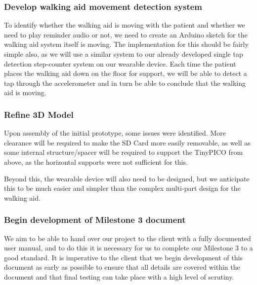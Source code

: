 {\subsubsection{Develop walking aid movement detection system}

To identify whether the walking aid is moving with the patient and whether we need to play reminder audio or not, we need to create an Arduino sketch for the walking aid system itself is moving. The implementation for this should be fairly simple also, as we will use a similar system to our already developed single tap detection step-counter system on our wearable device. Each time the patient places the walking aid down on the floor for support, we will be able to detect a tap through the accelerometer and in turn be able to conclude that the walking aid is moving.

\subsubsection{Refine 3D Model}

Upon assembly of the initial prototype, some issues were identified. More clearance will be required to make the SD Card more easily removable, as well as some internal structure/spacer will be required to support the TinyPICO from above, as the horizontal supports were not sufficient for this. 

Beyond this, the wearable device will also need to be designed, but we anticipate this to be much easier and simpler than the complex multi-part design for the walking aid.

\subsubsection{Begin development of Milestone 3 document}

We aim to be able to hand over our project to the client with a fully documented user manual, and to do this it is necessary for us to complete our Milestone 3 to a good standard. It is imperative to the client that we begin development of this document as early as possible to ensure that all details are covered within the document and that final testing can take place with a high level of scrutiny.

}
